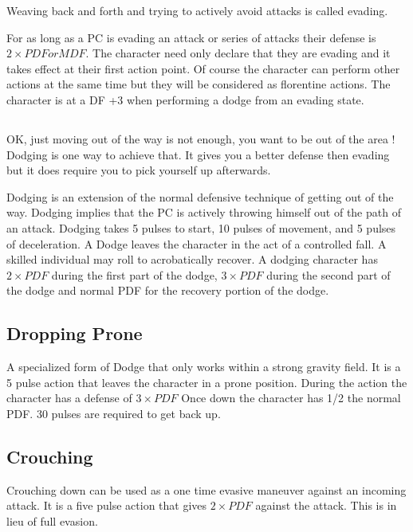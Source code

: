 Weaving back and forth and trying to actively avoid attacks is called evading.

For as long as a PC is evading an attack or series of attacks their defense is \( 2
\times PDF or MDF \). The character need only declare that they are evading and it takes effect at
their first action point. Of course the character can perform other actions
at the same time but they will be considered as florentine actions. The
character is at a DF +3 when performing a dodge from an evading state.

\subsection{}

OK, just moving out of the way is not enough,  you want to be out of the area ! Dodging is one way
to achieve that. It gives you a better defense then evading but it does require you to pick yourself up 
afterwards.

Dodging is an extension of the normal defensive technique of getting out
of the way. Dodging implies that the PC is actively throwing himself out
of the path of an attack. Dodging takes 5 pulses to start, 10 pulses of movement,
and 5 pulses of deceleration. A Dodge leaves the character in the act of
a controlled fall. A skilled individual may roll to acrobatically recover.
A dodging character has \( 2 \times PDF \) during the first part of the dodge,
\( 3 \times PDF \) during the second part of the dodge and normal PDF for
the recovery portion of the dodge.

\subsection{Dropping Prone}
A specialized form of Dodge that only works within a strong gravity
field. It is a 5 pulse action that leaves the character in a prone
position. During the action the character has a defense of \( 3 \times PDF \)
Once down the character has 1/2 the normal PDF. 30 pulses are required to
get back up.

\subsection{Crouching}

Crouching down can be used as a one time evasive maneuver against an
incoming attack. It is a five pulse action that gives \( 2 \times PDF \)
against the attack. This is in lieu of full evasion.

